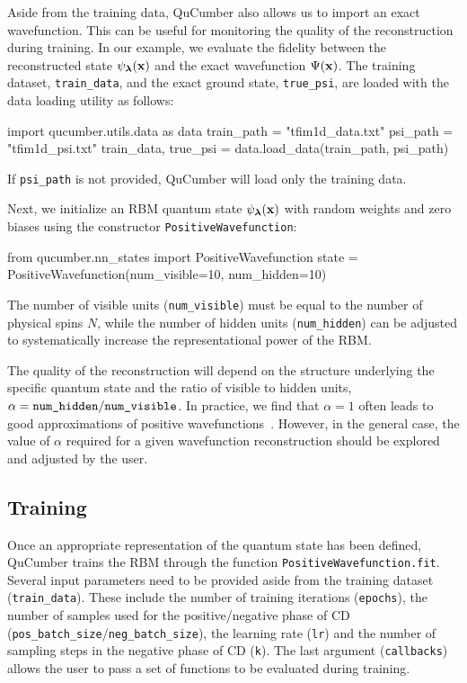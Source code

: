 \documentclass[submission, Phys, hidelnks]{SciPost}
\begin{document}
Aside from the training data, QuCumber also allows us to import an exact wavefunction. This can be useful for monitoring the quality of the reconstruction during training. In our example, we evaluate the fidelity between the reconstructed state $\psi_{\bm{\lambda}}(\bf{x})$ and the exact wavefunction $\Psi(\bf{x})$.
The training dataset, \verb|train_data|, and the exact ground state, \verb|true_psi|, are loaded with the data loading utility as follows:
\begin{python}
import qucumber.utils.data as data
train_path = "tfim1d_data.txt"
psi_path = "tfim1d_psi.txt"
train_data, true_psi = data.load_data(train_path, psi_path)
\end{python}
If \verb|psi_path| is not provided, QuCumber will load only the training data. 

Next, we initialize an RBM quantum state $\psi_{\bm{\lambda}}(\bf{x})$ with random weights and zero biases using the constructor \verb|PositiveWavefunction|:
\begin{python}
from qucumber.nn_states import PositiveWavefunction
state = PositiveWavefunction(num_visible=10, num_hidden=10)
\end{python}
The number of visible units (\verb|num_visible|) must be equal to the number of physical spins $N$, while the number of hidden units (\verb|num_hidden|) can be adjusted to systematically increase the representational power of the RBM. 

The quality of the reconstruction will depend on the structure underlying the specific quantum state and the ratio of visible to hidden units, $\alpha = \verb|num_hidden|/\verb|num_visible|$.
In practice, we find that $\alpha = 1$ often leads to good approximations of positive wavefunctions~\cite{torlai_neural-network_2018}. However, in the general case, the value of $\alpha$ required for a given wavefunction reconstruction should be explored and adjusted by the user.


\subsection{Training}
Once an appropriate representation of the quantum state has been defined, QuCumber trains the RBM through the function \verb|PositiveWavefunction.fit|. Several input parameters need to be provided aside from the training dataset (\verb|train_data|). These include the number of training iterations (\verb|epochs|), the number of samples used for the positive/negative phase of CD (\verb|pos_batch_size|/\verb|neg_batch_size|), the learning rate (\verb|lr|) and the number of sampling steps in the negative phase of CD (\verb|k|). The last argument (\verb|callbacks|) allows the user to pass a set of functions to be evaluated during training.
\end{document}
